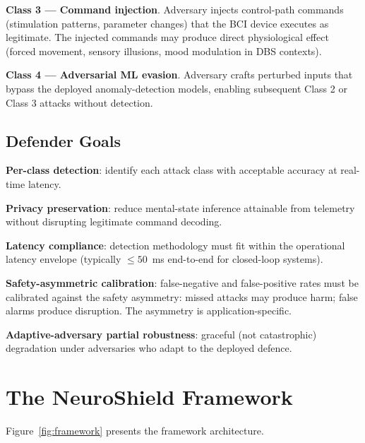 \documentclass[sigconf,nonacm]{acmart}
\begin{document}
\textbf{Class 3 --- Command injection}. Adversary injects
control-path commands (stimulation patterns, parameter changes)
that the BCI device executes as legitimate. The injected commands
may produce direct physiological effect (forced movement,
sensory illusions, mood modulation in DBS contexts).

\textbf{Class 4 --- Adversarial ML evasion}. Adversary crafts
perturbed inputs that bypass the deployed anomaly-detection
models, enabling subsequent Class 2 or Class 3 attacks without
detection.

\subsection{Defender Goals}

\textbf{Per-class detection}: identify each attack class with
acceptable accuracy at real-time latency.

\textbf{Privacy preservation}: reduce mental-state inference
attainable from telemetry without disrupting legitimate
command decoding.

\textbf{Latency compliance}: detection methodology must fit
within the operational latency envelope (typically $\leq 50$~ms
end-to-end for closed-loop systems).

\textbf{Safety-asymmetric calibration}: false-negative and
false-positive rates must be calibrated against the safety
asymmetry: missed attacks may produce harm; false alarms produce
disruption. The asymmetry is application-specific.

\textbf{Adaptive-adversary partial robustness}: graceful (not
catastrophic) degradation under adversaries who adapt to the
deployed defence.

\section{The NeuroShield Framework}

Figure~\ref{fig:framework} presents the framework architecture.
\end{document}

